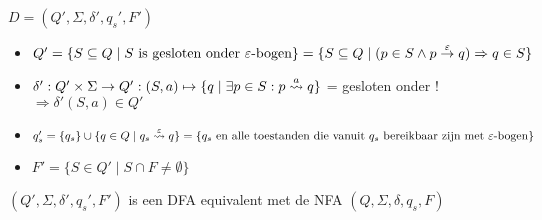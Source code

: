 \documentclass[../aanvullingen_cursus.tex]{subfiles}
\begin{document}
\(D = (Q',\Sigma, \delta', q_s', F')\)
\begin{itemize}
	\item \(Q' = \{S \subseteq Q \mid S \text{ is gesloten onder } \epsilon\text{-bogen}\} = \{S \subseteq Q \mid (p \in S \land p \rpijl{\epsilon} q) \Rightarrow q \in S \} \)
	\item \(\delta' : Q' \times \Sigma \to Q' : (S,a) \mapsto \{q \mid \exists p \in S: p \pijl{a} q\}\) = gesloten onder \epsilonbogen ! \(\Rightarrow \delta'(S,a) \in Q'\)
	\item \(q_s' = \{q_s\} \cup \{q \in Q \mid q_s \pijl{\epsilon} q \} = \{q_s \text{ en alle toestanden die vanuit $q_s$ bereikbaar zijn met \epsilonbogen}\} \)
	\item \(F' = \{S \in Q' \mid S \cap F \neq \emptyset\}\)
\end{itemize}

\begin{stelling}
	\( (Q',\Sigma, \delta', q_s',F') \) is een DFA equivalent met de NFA \((Q,\Sigma,\delta,q_s,F)\)
\end{stelling}
\end{document}
